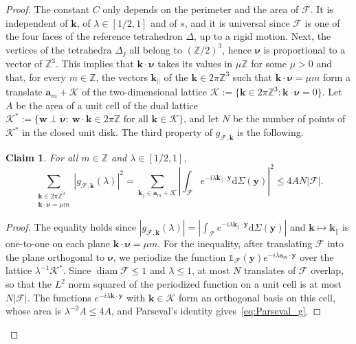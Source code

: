 \documentclass[final,reqno]{amsart}
\newtheorem*{claim}{Claim}
\theoremstyle{remark}
\renewcommand{\le}{\leqslant}
\newcommand{\ZZ}{\mathbb{Z}}
\newcommand{\iden}{\mathbb{1}}
\newcommand{\tetra}{\mathbb{\Delta}}
\newcommand{\dd}{\mathrm{d}}
\begin{document}
\begin{proof}
The constant $C$ only depends on the perimeter and the area of $\mathcal{F}$. It is independent of $\mathbf{k}$, of $\lambda\in[1/2,1]$ and of $s$, and it is universal since $\mathcal{F}$ is one of the four faces of the reference tetrahedron $\tetra$, up to a rigid motion. Next, the vertices of the tetrahedra $\tetra_j$ all belong to $(\ZZ/2)^3$, hence $\bm{\nu}$ is proportional to a vector of $\ZZ^3$. This implies that $\mathbf{k}\cdot \bm{\nu}$ takes its values in $\mu\ZZ$ for some $\mu>0$ and that, for every $m\in\ZZ$, the vectors $\mathbf{k}_\parallel$ of the $\mathbf{k}\in2\pi\ZZ^3$ such that $\mathbf{k}\cdot \bm{\nu}=\mu m$ form a translate $\mathbf{a}_m+\mathcal{K}$ of the two-dimensional lattice $\mathcal{K}:=\{\mathbf{k}\in2\pi\ZZ^3:\mathbf{k}\cdot\bm{\nu}=0\}$. Let $A$ be the area of a unit cell of the dual lattice $\mathcal{K}^*:=\{\mathbf{w}\perp\bm{\nu}:\ \mathbf{w}\cdot\mathbf{k}\in2\pi\ZZ\text{ for all }\mathbf{k}\in\mathcal{K}\}$, and let $N$ be the number of points of $\mathcal{K}^*$ in the closed unit disk. The third property of $g_{\mathcal{F},\mathbf{k}}$ is the following.

\begin{claim}
For all $m\in\ZZ$ and $\lambda\in[1/2,1]$,
\begin{equation}\label{eq:Parseval_g}
\sum_{\substack{\mathbf{k}\in2\pi\ZZ^3\\ \mathbf{k}\cdot \bm{\nu}=\mu m}}|g_{\mathcal{F},\mathbf{k}}(\lambda)|^2=\sum_{\mathbf{k}_\parallel\in\mathbf{a}_m+\mathcal{K}}\left|\int_{\mathcal{F}}e^{-i\lambda \mathbf{k}_\parallel\cdot \mathbf{y}}\dd\Sigma(\mathbf{y})\right|^2\le4AN|\mathcal{F}|.
\end{equation}
\end{claim}

\begin{proof}
The equality holds since $|g_{\mathcal{F},\mathbf{k}}(\lambda)|=|\int_{\mathcal{F}}e^{-i\lambda \mathbf{k}_\parallel\cdot \mathbf{y}}\dd\Sigma(\mathbf{y})|$ and $\mathbf{k}\mapsto\mathbf{k}_\parallel$ is one-to-one on each plane $\mathbf{k}\cdot\bm{\nu}=\mu m$. For the inequality, after translating $\mathcal{F}$ into the plane orthogonal to $\bm{\nu}$, we periodize the function $\iden_{\mathcal{F}}(\mathbf{y})e^{-i\lambda\mathbf{a}_m\cdot\mathbf{y}}$ over the lattice $\lambda^{-1}\mathcal{K}^*$. Since $\operatorname{diam}\mathcal{F}\le1$ and $\lambda\le1$, at most $N$ translates of $\mathcal{F}$ overlap, so that the $L^2$ norm squared of the periodized function on a unit cell is at most $N|\mathcal{F}|$. The functions $e^{-i\lambda\mathbf{k}\cdot\mathbf{y}}$ with $\mathbf{k}\in\mathcal{K}$ form an orthogonal basis on this cell, whose area is $\lambda^{-2}A\le4A$, and Parseval's identity gives~\cref{eq:Parseval_g}.
\end{proof}


\end{proof}
\end{document}
